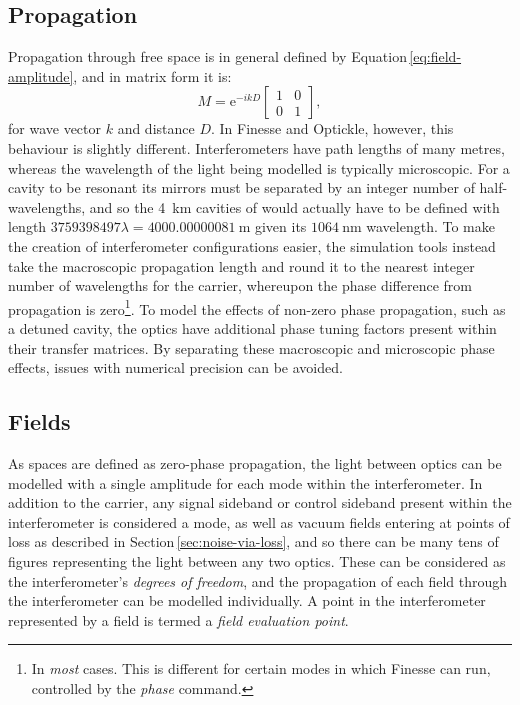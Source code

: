 \subsection{Propagation}
Propagation through free space is in general defined by Equation\,\ref{eq:field-amplitude}, and in matrix form it is:
\begin{equation}
  M = \text{e}^{-ikD}
  \begin{bmatrix}
    1 & 0 \\
    0 & 1
  \end{bmatrix}
  ,
\end{equation}
for wave vector $k$ and distance $D$. In Finesse and Optickle, however, this behaviour is slightly different. Interferometers have path lengths of many metres, whereas the wavelength of the light being modelled is typically microscopic. For a cavity to be resonant its mirrors must be separated by an integer number of half-wavelengths, and so the \SI{4}{\kilo\meter} \FP{} cavities of \ALIGO{} would actually have to be defined with length $\num{3759398497}\lambda = \SI{4000.00000081}{\meter}$ given its $\SI{1064}{\nano\meter}$ wavelength. To make the creation of interferometer configurations easier, the simulation tools instead take the macroscopic propagation length and round it to the nearest integer number of wavelengths for the carrier, whereupon the phase difference from propagation is zero\footnote{In \emph{most} cases. This is different for certain modes in which Finesse can run, controlled by the \emph{phase} command.}. To model the effects of non-zero phase propagation, such as a detuned cavity, the optics have additional phase tuning factors present within their transfer matrices. By separating these macroscopic and microscopic phase effects, issues with numerical precision can be avoided.

\subsection{Fields}
As spaces are defined as zero-phase propagation, the light between optics can be modelled with a single amplitude for each mode within the interferometer. In addition to the carrier, any signal sideband or control sideband present within the interferometer is considered a mode, as well as vacuum fields entering at points of loss as described in Section\,\ref{sec:noise-via-loss}, and so there can be many tens of figures representing the light between any two optics. These can be considered as the interferometer's \emph{degrees of freedom}, and the propagation of each field through the interferometer can be modelled individually. A point in the interferometer represented by a field is termed a \emph{field evaluation point}.

